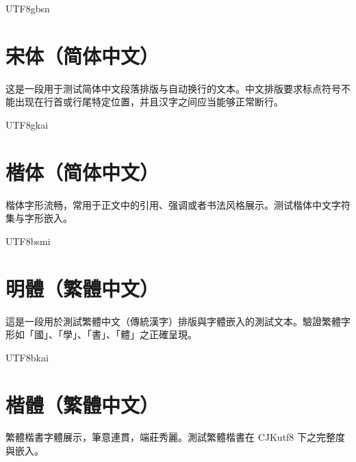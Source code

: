 \documentclass{article}
\begin{document}
\begin{CJK}{UTF8}{gbsn}
\section*{宋体（简体中文）}
这是一段用于测试简体中文段落排版与自动换行的文本。中文排版要求标点符号不能出现在行首或行尾特定位置，并且汉字之间应当能够正常断行。
\end{CJK}

\bigskip

\begin{CJK}{UTF8}{gkai}
\section*{楷体（简体中文）}
楷体字形流畅，常用于正文中的引用、强调或者书法风格展示。测试楷体中文字符集与字形嵌入。
\end{CJK}

\bigskip

\begin{CJK}{UTF8}{bsmi}
\section*{明體（繁體中文）}
這是一段用於測試繁體中文（傳統漢字）排版與字體嵌入的測試文本。驗證繁體字形如「國」、「學」、「書」、「體」之正確呈現。
\end{CJK}

\bigskip

\begin{CJK}{UTF8}{bkai}
\section*{楷體（繁體中文）}
繁體楷書字體展示，筆意連貫，端莊秀麗。測試繁體楷書在 CJKutf8 下之完整度與嵌入。
\end{CJK}
\end{document}
